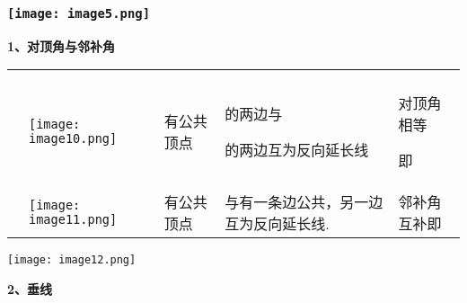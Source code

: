 \hypertarget{ux5b66ux79d1ux7f51www.zxxk.com--ux6559ux80b2ux8d44ux6e90ux95e8ux6237ux63d0ux4f9bux8bd5ux9898ux8bd5ux5377ux6559ux6848ux8bfeux4ef6ux6559ux5b66ux8bbaux6587ux7d20ux6750ux7b49ux5404ux7c7bux6559ux5b66ux8d44ux6e90ux5e93ux4e0bux8f7dux8fd8ux6709ux5927ux91cfux4e30ux5bccux7684ux6559ux5b66ux8d44ux8baf-5}{%
\subsubsection{\texorpdfstring{\protect\texttt{[image: image5.png]}}{学科网(www.zxxk.com)-\/-教育资源门户，提供试题试卷、教案、课件、教学论文、素材等各类教学资源库下载，还有大量丰富的教学资讯！}}\label{ux5b66ux79d1ux7f51www.zxxk.com--ux6559ux80b2ux8d44ux6e90ux95e8ux6237ux63d0ux4f9bux8bd5ux9898ux8bd5ux5377ux6559ux6848ux8bfeux4ef6ux6559ux5b66ux8bbaux6587ux7d20ux6750ux7b49ux5404ux7c7bux6559ux5b66ux8d44ux6e90ux5e93ux4e0bux8f7dux8fd8ux6709ux5927ux91cfux4e30ux5bccux7684ux6559ux5b66ux8d44ux8baf-5}}

\textbf{1、对顶角与邻补角}

\begin{longtable}[]{@{}lllll@{}}
\toprule
\endhead
& & & &\tabularnewline
\begin{minipage}[t]{0.17\columnwidth}\raggedright
\strut
\end{minipage} & \begin{minipage}[t]{0.17\columnwidth}\raggedright
\texttt{[image: image10.png]}\strut
\end{minipage} & \begin{minipage}[t]{0.17\columnwidth}\raggedright
有公共顶点\strut
\end{minipage} & \begin{minipage}[t]{0.17\columnwidth}\raggedright
的两边与

的两边互为反向延长线\strut
\end{minipage} & \begin{minipage}[t]{0.17\columnwidth}\raggedright
对顶角相等

即\strut
\end{minipage}\tabularnewline
&
\texttt{[image: image11.png]}
& 有公共顶点 & 与有一条边公共，另一边互为反向延长线. &
邻补角互补即\tabularnewline
\bottomrule
\end{longtable}

\texttt{[image: image12.png]}

\textbf{2、垂线}

